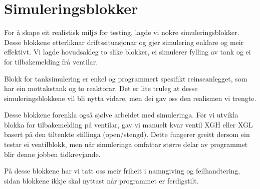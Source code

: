 \section{Simuleringsblokker}
\thispagestyle{fancy}

For å skape eit realistisk miljø for testing, lagde vi nokre simuleringsblokker.
Desse blokkene etterliknar driftssituasjonar og gjer simulering enklare og meir effektivt.
Vi lagde hovudsakleg to slike blokker, ei simulerer fylling av tank
og ei for tilbakemelding frå ventilar.

Blokk for tanksimulering er enkel og programmert spesifikt reinseanlegget, 
som har ein mottakstank og to reaktorar.
Det er lite truleg at desse simuleringsblokkene vil bli nytta vidare, men dei gav
oss den realismen vi trengte.

Desse blokkene forenkla også sjølve arbeidet med simuleringa.
Før vi utvikla blokka for tilbakemelding på ventilar, 
gav vi manuelt kvar ventil \gls{XGH} eller \gls{XGL} basert på den tiltenkte stillinga (open/stengd). \newline
Dette fungerer greitt dersom ein testar ei ventilblokk, men
når simuleringa omfattar større delar av programmet blir denne jobben tidkrevjande.

På desse blokkene har vi tatt oss meir friheit i namngiving og feilhandtering, sidan blokkene ikkje skal nyttast når programmet er ferdigstilt.


